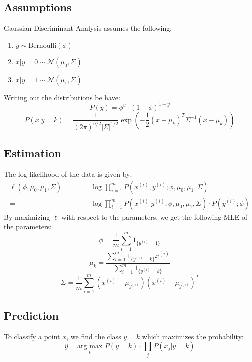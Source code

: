 \documentclass[twoside,twocolumn]{article}
\begin{document}
\subsection{Assumptions}
Gaussian Discriminant Analysis assumes the following:
\begin{enumerate}
  \item $y\sim\textrm{Bernoulli}(\phi)$
  \item $x|y=0\sim\mathcal{N}(\mu_0,\Sigma)$
  \item $x|y=1\sim\mathcal{N}(\mu_1,\Sigma)$
\end{enumerate}
Writing out the distributions be have:
\begin{equation}
  P(y) = \phi^y \cdot (1-\phi)^{1-y}
\end{equation}
\begin{equation}
  P(x|y=k) = \frac{1}{(2\pi)^{n/2}|\Sigma|^{1/2}} \exp \left(-\frac{1}{2} (x-\mu_k)^T \Sigma^{-1} (x - \mu_k)\right)
\end{equation}
\subsection{Estimation}
The log-likelihood of the data is given by:
\begin{equation}
  \begin{aligned}
    \ell(\phi, \mu_0, \mu_1, \Sigma) \quad =& \quad \log \prod_{i=1}^{m}P(x^{(i)}, y^{(i)}; \phi, \mu_0, \mu_1, \Sigma) \\
    =& \quad \log \prod_{i=1}^m P(x^{(i)}| y^{(i)}; \phi, \mu_0, \mu_1, \Sigma) \cdot P(y^{(i)}; \phi)
  \end{aligned}
\end{equation}
By maximizing $\ell$ with respect to the parameters, we get the following MLE
of the parameters:
\begin{equation}
  \phi = \displaystyle\frac{1}{m}\sum_{i=1}^m1_{\{y^{(i)}=1\}}
\end{equation}
\begin{equation}
  \mu_k = \displaystyle\frac{\sum_{i=1}^m1_{\{y^{(i)}=k\}}x^{(i)}}{\sum_{i=1}^m1_{\{y^{(i)}=k\}}}
\end{equation}
\begin{equation}
  \Sigma = \displaystyle\frac{1}{m}\sum_{i=1}^m(x^{(i)}-\mu_{y^{(i)}})(x^{(i)}-\mu_{y^{(i)}})^T
\end{equation}
\subsection{Prediction}
To classify a point $x$, we find the class $y=k$ which maximizes the probability:
\begin{equation}
  \hat{y} = \underset{k}{\textrm{arg max}} \,\, P(y=k) \cdot\prod_j P(x_j | y=k)
\end{equation}
\end{document}
